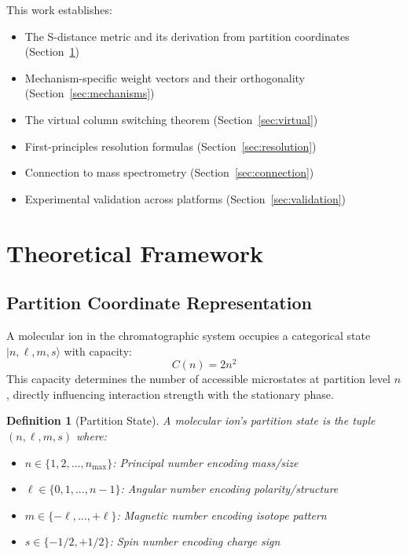 \documentclass[twocolumn,10pt]{article}
\newtheorem{definition}[theorem]{Definition}
\begin{document}
This work establishes:
\begin{itemize}
    \item The S-distance metric and its derivation from partition coordinates (Section~\ref{sec:theory})
    \item Mechanism-specific weight vectors and their orthogonality (Section~\ref{sec:mechanisms})
    \item The virtual column switching theorem (Section~\ref{sec:virtual})
    \item First-principles resolution formulas (Section~\ref{sec:resolution})
    \item Connection to mass spectrometry (Section~\ref{sec:connection})
    \item Experimental validation across platforms (Section~\ref{sec:validation})
\end{itemize}

\section{Theoretical Framework}
\label{sec:theory}

\subsection{Partition Coordinate Representation}

A molecular ion in the chromatographic system occupies a categorical state $|n, \ell, m, s\rangle$ with capacity:
\begin{equation}
C(n) = 2n^2
\end{equation}
This capacity determines the number of accessible microstates at partition level $n$, directly influencing interaction strength with the stationary phase.

\begin{definition}[Partition State]
\label{def:partition_state}
A molecular ion's partition state is the tuple $(n, \ell, m, s)$ where:
\begin{itemize}
    \item $n \in \{1, 2, ..., n_{\max}\}$: Principal number encoding mass/size
    \item $\ell \in \{0, 1, ..., n-1\}$: Angular number encoding polarity/structure
    \item $m \in \{-\ell, ..., +\ell\}$: Magnetic number encoding isotope pattern
    \item $s \in \{-1/2, +1/2\}$: Spin number encoding charge sign
\end{itemize}
\end{definition}
\end{document}
